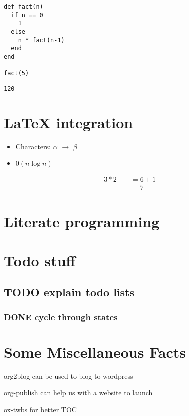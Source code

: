 \documentclass[11pt]{article}
\begin{document}
\begin{verbatim}
def fact(n)
  if n == 0
    1
  else
    n * fact(n-1)
  end
end

fact(5)
\end{verbatim}

\begin{verbatim}
120
\end{verbatim}
\section{\LaTeX{} integration}
\label{sec:org97d8ab7}
\begin{itemize}
\item Characters: \(\alpha\) \(\rightarrow\) \(\beta\)
\item \(0(n \log n)\)
\end{itemize}

\begin{align*}
   3 * 2 + &= 6 + 1 \\
           &= 7
\end{align*}

\section{Literate programming}
\label{sec:org6d38905}

\section{Todo stuff}
\label{sec:org0c56449}
\subsection{{\bfseries\sffamily TODO} explain todo lists}
\label{sec:orga955a5d}
\subsubsection{{\bfseries\sffamily DONE} cycle through states}
\label{sec:orgb839ae2}
\section{Some Miscellaneous Facts}
\label{sec:org330c812}
org2blog can be used to blog to wordpress

org-publish can help us with a website to launch

ox-twbs for better TOC
\end{document}
